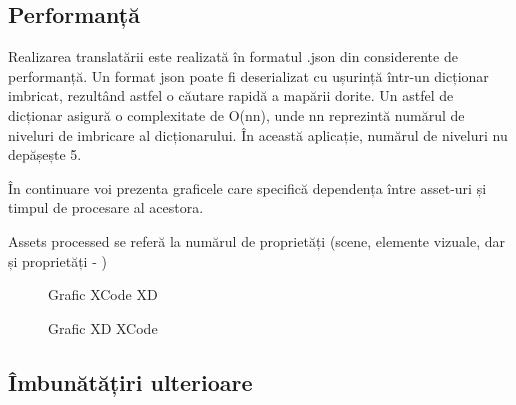 \subsection{Performanță}


Realizarea translatării este realizată în formatul .json din considerente de performanță. Un format json poate fi deserializat cu ușurință într-un dicționar imbricat, rezultând astfel o căutare rapidă a mapării dorite. Un astfel de dicționar asigură o complexitate de O(nn), unde nn reprezintă numărul de niveluri de imbricare al dicționarului. În această aplicație, numărul de niveluri nu depășește 5.  

În continuare voi prezenta graficele care specifică dependența între asset-uri și timpul de procesare al acestora.

Assets processed se referă la numărul de proprietăți (scene, elemente vizuale, dar și proprietăți - )

\begin{figure}[!htbp]
\centering
{}
\caption{Grafic XCode XD} \label{fig:Grafic1}
\end{figure}

\begin{figure}[!htbp]
\centering
{}
\caption{Grafic XD XCode} \label{fig:Grafic2}
\end{figure}

\subsection{Îmbunătățiri ulterioare}

